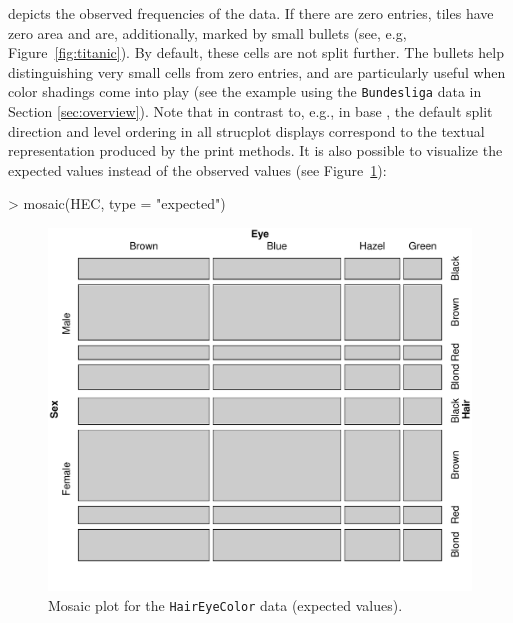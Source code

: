 \documentclass{Z}
\newcommand{\data}[1]{\texttt{#1}}
\newcommand{\codefun}[1]{\code{#1()}}
\begin{document}
\noindent depicts the observed frequencies of the 
data. If there are zero entries, tiles have zero area and are, additionally,
marked by small bullets (see, e.g, Figure~\ref{fig:titanic}). By
default, these cells are not split further. The bullets help
distinguishing very small cells from zero entries, and are
particularly useful when color shadings come into play 
(see the example using the \data{Bundesliga} data in Section \ref{sec:overview}). 
Note that in contrast to, e.g.,  \codefun{mosaicplot} in base
, the default split direction and level ordering in all strucplot
displays correspond to the textual representation produced by the
print methods.
It is also possible to visualize the expected values instead of the
observed values (see Figure~\ref{fig:expected}):

\begin{Schunk}
\begin{Sinput}
> mosaic(HEC, type = "expected")
\end{Sinput}
\end{Schunk}

\begin{figure}[p]
\begin{center}
\includegraphics{strucplot-Expectedfig}
\caption{Mosaic plot for the \data{HairEyeColor} data (expected values).}
\label{fig:expected}
\end{center}
\end{figure}
\end{document}
